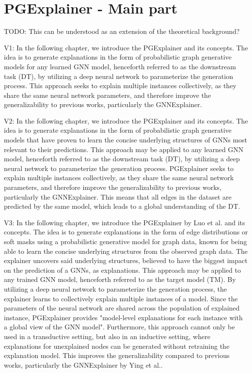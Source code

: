 \chapter{PGExplainer - Main part}
\label{ch:PGExplainer}
TODO: This can be understood as an extension of the theoretical background?

V1: In the following chapter, we introduce the PGExplainer\cite{luo2020parameterized} and its concepts. The idea is to generate explanations in the form of probabilistic graph generative models for any learned GNN model, henceforth referred to as the downstream task (DT), by utilizing a deep neural network to parameterize the generation process. This approach seeks to explain multiple instances collectively, as they share the same neural network parameters, and therefore improve the generalizability to previous works, particularly the GNNExplainer\cite{ying2019gnnexplainer}.

V2: In the following chapter, we introduce the PGExplainer\cite{luo2020parameterized} and its concepts. The idea is to generate explanations in the form of probabilistic graph generative models that have proven to learn the concise underlying structures of GNNs most relevant to their predictions. This approach may be applied to any learned GNN model, henceforth referred to as the downstream task (DT), by utilizing a deep neural network to parameterize the generation process. PGExplainer seeks to explain multiple instances collectively, as they share the same neural network parameters, and therefore improve the generalizability to previous works, particularly the GNNExplainer\cite{ying2019gnnexplainer}. This means that all edges in the dataset are predicted by the same model, which leads to a global understanding of the DT.

V3: In the following chapter, we introduce the PGExplainer by Luo et al.\cite{luo2020parameterized} and its concepts. The idea is to generate explanations in the form of edge distributions or soft masks using a probabilistic generative model for graph data, known for being able to learn the concise underlying structures from the observed graph data. The explainer uncovers said underlying structures, believed to have the biggest impact on the prediction of a GNNs, as explanations. This approach may be applied to any trained GNN model, henceforth referred to as the target model (TM). 
By utilizing a deep neural network to parameterize the generation process, the explainer learns to collectively explain multiple instances of a model. Since the parameters of the neural network are shared across the population of explained instance, PGExplainer provides "model-level explanations for each instance with a global view of the GNN model". Furthermore, this approach cannot only be used in a transductive setting, but also in an inductive setting, where explanations for unexplained nodes can be generated without retraining the explanation model. This improves the generalizability compared to previous works, particularly the GNNExplainer by Ying et al.\cite{ying2019gnnexplainer}.

